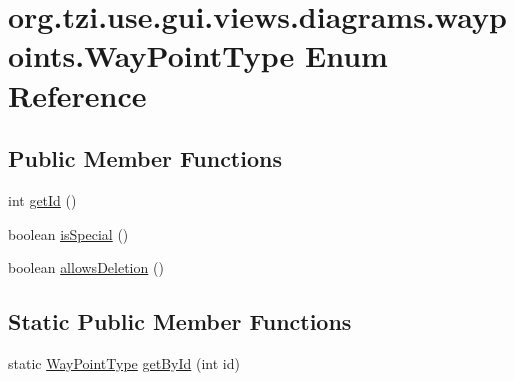\hypertarget{enumorg_1_1tzi_1_1use_1_1gui_1_1views_1_1diagrams_1_1waypoints_1_1_way_point_type}{\section{org.\-tzi.\-use.\-gui.\-views.\-diagrams.\-waypoints.\-Way\-Point\-Type Enum Reference}
\label{enumorg_1_1tzi_1_1use_1_1gui_1_1views_1_1diagrams_1_1waypoints_1_1_way_point_type}
}
\subsection*{Public Member Functions}
\begin{DoxyCompactItemize}
\item 
int \hyperlink{enumorg_1_1tzi_1_1use_1_1gui_1_1views_1_1diagrams_1_1waypoints_1_1_way_point_type_aed0a96f11e2080f8e903dc14de5fb814}{get\-Id} ()
\item 
boolean \hyperlink{enumorg_1_1tzi_1_1use_1_1gui_1_1views_1_1diagrams_1_1waypoints_1_1_way_point_type_afba1e02ceb28c5a2cad37e1760df9956}{is\-Special} ()
\item 
boolean \hyperlink{enumorg_1_1tzi_1_1use_1_1gui_1_1views_1_1diagrams_1_1waypoints_1_1_way_point_type_a3e409914680ca983f1497001e56e48de}{allows\-Deletion} ()
\end{DoxyCompactItemize}
\subsection*{Static Public Member Functions}
\begin{DoxyCompactItemize}
\item 
static \hyperlink{enumorg_1_1tzi_1_1use_1_1gui_1_1views_1_1diagrams_1_1waypoints_1_1_way_point_type}{Way\-Point\-Type} \hyperlink{enumorg_1_1tzi_1_1use_1_1gui_1_1views_1_1diagrams_1_1waypoints_1_1_way_point_type_af345757385b74b86834861f7c0428251}{get\-By\-Id} (int id)
\end{DoxyCompactItemize}

